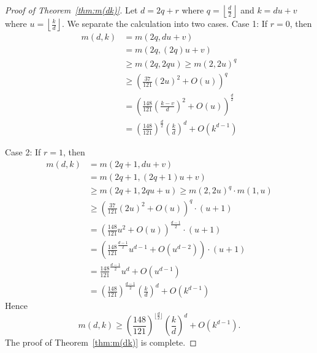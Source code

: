 \documentclass[11pt]{article}
\theoremstyle{definition}
\begin{document}
\begin{proof}[Proof of Theorem~\ref{thm:m(dk)}]
Let $d = 2q +r$ where $q =\displaystyle\left \lfloor \frac{d}{2}\right\rfloor$ and $k = du +v$ where $u =\displaystyle \left \lfloor \frac{k}{d}\right\rfloor$. We separate the calculation into two cases.
Case 1: If $r = 0$, then
\begin{align*}
m(d,k) &= m(2q, du +v)\\
&= m(2q, (2q)u +v)\\
&\geq m(2q, 2qu) \geq m(2, 2u)^q\\
&\geq \left(\frac{37}{121}(2u)^2+ O(u)\right)^q \\
&= \left(\frac{148}{121} \left(\frac{k-v}{d}\right) ^2+ O(u)\right)^{ \frac{d}{2}}\\
&= \left(\frac{148}{121}\right)^{ \frac{d}{2}}\left(\frac{k}{d}\right)^d + O(k^{d-1})
\end{align*}

Case 2: If $r = 1$, then
\begin{align*}
m(d,k) &= m(2q+1, du +v)\\
&= m(2q+1, (2q+1)u +v)\\
&\geq m(2q+1, 2qu + u) \geq m(2, 2u)^q \cdot m(1,u)\\
&\geq \left(\frac{37}{121}(2u)^2+ O(u)\right)^q \cdot (u+1) \\
&= \left(\frac{148}{121} u^2 + O(u)\right)^{ \frac{d-1}{2}} \cdot (u+1)\\
&= \left(\frac{148}{121}^{ \frac{d-1}{2}} u ^{d-1}+ O(u^{d-2})\right) \cdot (u+1)\\
&= \frac{148}{121}^{ \frac{d-1}{2}} u ^{d}+ O(u^{d-1})\\
&= \left(\frac{148}{121}\right)^{ \frac{d-1}{2}}\left(\frac{k}{d}\right)^d + O(k^{d-1})
\end{align*}
Hence 
\[
m(d,k) \geq \left(\frac{148}{121}\right)^{\lfloor \frac{d}{2}\rfloor}\left(\frac{k}{d}\right)^d + O(k^{d-1}).
\]
The proof of Theorem~\ref{thm:m(dk)} is complete.
\end{proof}



\end{document}
